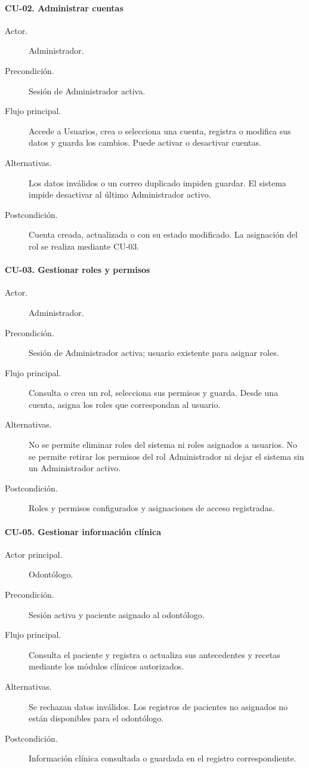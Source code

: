 \paragraph{CU-02. Administrar cuentas}
\begin{description}

\item[Actor.] Administrador.
\item[Precondición.] Sesión de Administrador activa.
\item[Flujo principal.] Accede a Usuarios, crea o selecciona una cuenta, registra o modifica sus datos y guarda los cambios. Puede activar o desactivar cuentas.
\item[Alternativas.] Los datos inválidos o un correo duplicado impiden guardar. El sistema impide desactivar al último Administrador activo.
\item[Postcondición.] Cuenta creada, actualizada o con su estado modificado. La asignación del rol se realiza mediante CU-03.
\end{description}

\paragraph{CU-03. Gestionar roles y permisos}
\begin{description}

\item[Actor.] Administrador.
\item[Precondición.] Sesión de Administrador activa; usuario existente para asignar roles.
\item[Flujo principal.] Consulta o crea un rol, selecciona sus permisos y guarda. Desde una cuenta, asigna los roles que correspondan al usuario.
\item[Alternativas.] No se permite eliminar roles del sistema ni roles asignados a usuarios. No se permite retirar los permisos del rol Administrador ni dejar el sistema sin un Administrador activo.
\item[Postcondición.] Roles y permisos configurados y asignaciones de acceso registradas.
\end{description}

\paragraph{CU-05. Gestionar información clínica}
\begin{description}

\item[Actor principal.] Odontólogo.
\item[Precondición.] Sesión activa y paciente asignado al odontólogo.
\item[Flujo principal.] Consulta el paciente y registra o actualiza sus antecedentes y recetas mediante los módulos clínicos autorizados.
\item[Alternativas.] Se rechazan datos inválidos. Los registros de pacientes no asignados no están disponibles para el odontólogo.
\item[Postcondición.] Información clínica consultada o guardada en el registro correspondiente.
\end{description}

